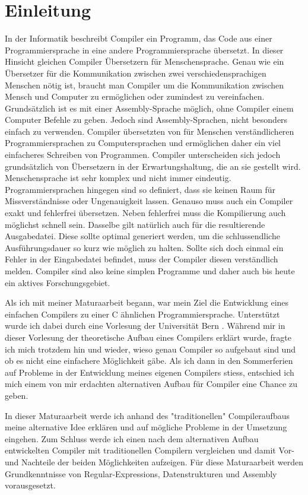 \chapter{Einleitung}
In der Informatik beschreibt Compiler ein Programm, das Code aus einer Programmiersprache in eine andere Programmiersprache übersetzt. In dieser Hinsicht gleichen Compiler Übersetzern für Menschensprache.
Genau wie ein Übersetzer für die Kommunikation zwischen zwei verschiedensprachigen Menschen nötig ist, braucht man Compiler um die Kommunikation zwischen Mensch und Computer zu ermöglichen oder zumindest zu vereinfachen.
Grundsätzlich ist es mit einer Assembly-Sprache möglich, ohne Compiler einem Computer Befehle zu geben. Jedoch sind Assembly-Sprachen, nicht besonders einfach zu verwenden.
Compiler übersetzten von für Menschen verständlicheren Programmiersprachen zu Computersprachen und ermöglichen daher ein viel einfacheres Schreiben von Programmen.
Compiler unterscheiden sich jedoch grundsätzlich von Übersetzern in der Erwartungshaltung, die an sie gestellt wird. Menschensprache ist sehr komplex und nicht immer eindeutig. 
Programmiersprachen hingegen sind so definiert, dass sie keinen Raum für Missverständnisse oder Ungenauigkeit lassen. Genauso muss auch ein Compiler exakt und fehlerfrei übersetzen.
Neben fehlerfrei muss die Kompilierung auch möglichst schnell sein. Dasselbe gilt natürlich auch für die resultierende Ausgabedatei. Diese sollte optimal generiert werden, um die schlussendliche
Ausführungsdauer so kurz wie möglich zu halten. Sollte sich doch einmal ein Fehler in der Eingabedatei befindet, muss der Compiler diesen verständlich melden. Compiler sind also keine simplen Programme und daher auch bis heute
ein aktives Forschungsgebiet.

Als ich mit meiner Maturaarbeit begann, war mein Ziel die Entwicklung eines einfachen Compilers zu einer C ähnlichen Programmiersprache. Unterstützt wurde ich dabei durch eine Vorlesung der Universität Bern \cite{Lecture}.
Während mir in dieser Vorlesung der theoretische Aufbau eines Compilers erklärt wurde, fragte ich mich trotzdem hin und wieder, wieso genau Compiler so aufgebaut sind und
ob es nicht eine einfachere Möglichkeit gäbe. Als ich dann in den Sommerferien auf Probleme in der Entwicklung meines eigenen Compilers stiess, entschied ich mich einem von mir erdachten alternativen Aufbau für Compiler eine Chance zu geben. 

In dieser Maturaarbeit werde ich anhand des "traditionellen"{} Compileraufbaus meine alternative Idee erklären und auf mögliche Probleme in der Umsetzung eingehen.
Zum Schluss werde ich einen nach dem alternativen Aufbau entwickelten Compiler mit traditionellen Compilern vergleichen und damit Vor- und Nachteile der beiden Möglichkeiten aufzeigen.
Für diese Maturaarbeit werden Grundkenntnisse von Regular-Expressions, Datenstrukturen und Assembly vorausgesetzt.


